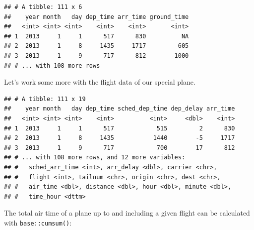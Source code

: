 \documentclass[]{book}
\newenvironment{Shaded}{}{}
\newcommand{\DataTypeTok}[1]{#1}
\newcommand{\KeywordTok}[1]{\textcolor[rgb]{0.00,0.00,1.00}{#1}}
\newcommand{\NormalTok}[1]{#1}
\newcommand{\OperatorTok}[1]{#1}
\newcommand{\StringTok}[1]{\textcolor[rgb]{0.00,0.50,0.50}{#1}}
\begin{document}
\begin{verbatim}
## # A tibble: 111 x 6
##    year month   day dep_time arr_time ground_time
##   <int> <int> <int>    <int>    <int>       <int>
## 1  2013     1     1      517      830          NA
## 2  2013     1     8     1435     1717         605
## 3  2013     1     9      717      812       -1000
## # ... with 108 more rows
\end{verbatim}

Let's work some more with the flight data of our special plane.

\begin{Shaded}
\end{Shaded}

\begin{verbatim}
## # A tibble: 111 x 19
##    year month   day dep_time sched_dep_time dep_delay arr_time
##   <int> <int> <int>    <int>          <int>     <dbl>    <int>
## 1  2013     1     1      517            515         2      830
## 2  2013     1     8     1435           1440        -5     1717
## 3  2013     1     9      717            700        17      812
## # ... with 108 more rows, and 12 more variables:
## #   sched_arr_time <int>, arr_delay <dbl>, carrier <chr>,
## #   flight <int>, tailnum <chr>, origin <chr>, dest <chr>,
## #   air_time <dbl>, distance <dbl>, hour <dbl>, minute <dbl>,
## #   time_hour <dttm>
\end{verbatim}

The total air time of a plane up to and including a given flight can be calculated with \texttt{base::cumsum()}:

\begin{Shaded}
\end{Shaded}
\end{document}
